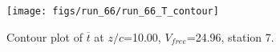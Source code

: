 \begin{figure}[H]
\centering
\texttt{[image: figs/run\_66/run\_66\_T\_contour]}
\caption{Contour plot of $\overline{t}$ at $z/c$=10.00, $V_{free}$=24.96, station 7.}
\end{figure}


